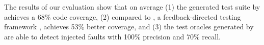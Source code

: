 The results of our evaluation show that on average (1) the generated test suite by \tool achieves a 68\% \javascript code coverage, 
(2) compared to \artemis, a feedback-directed \javascript testing framework \cite{artzi:icse11}, \tool achieves 53\% better coverage, and (3) the test oracles generated by \tool are able to detect injected faults with 100\% precision and 70\% recall.





